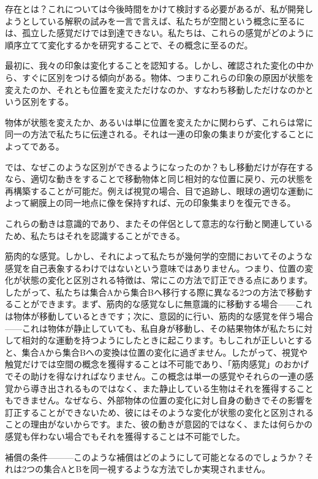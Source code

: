 \documentclass[a4paper,11pt,openany]{ltjsbook}
\begin{document}
存在とは？これについては今後時間をかけて検討する必要があるが、私が開発しようとしている解釈の試みを一言で言えば、私たちが空間という概念に至るには、孤立した感覚だけでは到達できない。私たちは、これらの感覚がどのように順序立てて変化するかを研究することで、その概念に至るのだ。

最初に、我々の印象は変化することを認知する。しかし、確認された変化の中から、すぐに区別をつける傾向がある。物体、つまりこれらの印象の原因が状態を変えたのか、それとも位置を変えただけなのか、すなわち移動しただけなのかという区別をする。

物体が状態を変えたか、あるいは単に位置を変えたかに関わらず、これらは常に同一の方法で私たちに伝達される。それは一連の印象の集まりが変化することによってである。

では、なぜこのような区別ができるようになったのか？もし移動だけが存在するなら、適切な動きをすることで移動物体と同じ相対的な位置に戻り、元の状態を再構築することが可能だ。例えば視覚の場合、目で追跡し、眼球の適切な運動によって網膜上の同一地点に像を保持すれば、元の印象集まりを復元できる。

これらの動きは意識的であり、またその伴侶として意志的な行動と関連しているため、私たちはそれを認識することができる。

筋肉的な感覚。しかし、それによって私たちが幾何学的空間においてそのような感覚を自己表象するわけではないという意味ではありません。つまり、位置の変化が状態の変化と区別される特徴は、常にこの方法で訂正できる点にあります。したがって、私たちは集合Aから集合Bへ移行する際に異なる2つの方法で移動することができます。まず、筋肉的な感覚なしに無意識的に移動する場合——これは物体が移動しているときです；次に、意図的に行い、筋肉的な感覚を伴う場合——これは物体が静止していても、私自身が移動し、その結果物体が私たちに対して相対的な運動を持つようにしたときに起こります。もしこれが正しいとすると、集合Aから集合Bへの変換は位置の変化に過ぎません。したがって、視覚や触覚だけでは空間の概念を獲得することは不可能であり、「筋肉感覚」のおかげでその助けを得なければなりません。この概念は単一の感覚やそれらの一連の感覚から導き出されるものではなく、また静止している生物はそれを獲得することもできません。なぜなら、外部物体の位置の変化に対し自身の動きでその影響を訂正することができないため、彼にはそのような変化が状態の変化と区別されることの理由がないからです。また、彼の動きが意図的ではなく、または何らかの感覚も伴わない場合でもそれを獲得することは不可能でした。

補償の条件———このような補償はどのようにして可能となるのでしょうか？それは2つの集合AとBを同一視するような方法でしか実現されません。
\end{document}
